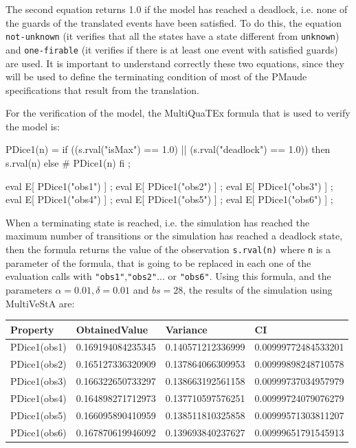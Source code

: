 The second equation returns 1.0 if the model has reached a deadlock, i.e. none of the guards of the translated events have been satisfied. To do this, the equation \texttt{not-unknown} (it verifies that all the states have a state different from \texttt{unknown}) and \texttt{one-firable} (it verifies if there is at least one event with satisfied guards) are used. It is important to understand correctly these two equations, since they will be used to define the terminating condition of most of the PMaude specifications that result from the translation. 

For the verification of the model, the MultiQuaTEx formula that is used to verify the model is:
\begin{maude2}

PDice1(n) = if ((s.rval("isMax") == 1.0) || (s.rval("deadlock") == 1.0)) 
            then s.rval(n) else # PDice1(n) fi ;

eval E[ PDice1("obs1") ] ;
eval E[ PDice1("obs2") ] ;
eval E[ PDice1("obs3") ] ;
eval E[ PDice1("obs4") ] ;
eval E[ PDice1("obs5") ] ;
eval E[ PDice1("obs6") ] ;
\end{maude2}
When a terminating state is reached, i.e. the simulation has reached the maximum number of transitions or the simulation has reached a deadlock state, then the formula returns the value of the observation \texttt{s.rval(n)} where \texttt{n} is a parameter of the formula, that is going to be replaced in each one of the evaluation calls with \texttt{"obs1"},\texttt{"obs2"}... or \texttt{"obs6"}. Using this formula, and the parameters $\alpha = 0.01, \delta = 0.01$ and $bs = 28$, the results of the simulation using MultiVeStA are:
\begin{table}[H]
\centering
\begin{tabular}{|l|l|l|l|}
\hline
Property     & ObtainedValue     & Variance          & CI                  \\ \hline
PDice1(obs1) & 0.169194084235345 & 0.140571212336999 & 0.00999772484533201 \\ \hline
PDice1(obs2) & 0.165127336320909 & 0.137864066309953 & 0.00999898248710578 \\ \hline
PDice1(obs3) & 0.166322650733297 & 0.138663192561158 & 0.00999737034957979 \\ \hline
PDice1(obs4) & 0.164898271712973 & 0.137710597576251 & 0.00999724079076279 \\ \hline
PDice1(obs5) & 0.166095890410959 & 0.138511810325858 & 0.00999571303811207 \\ \hline
PDice1(obs6) & 0.167870619946092 & 0.139693840237627 & 0.00999651791545913 \\ \hline
\end{tabular}
\end{table}

